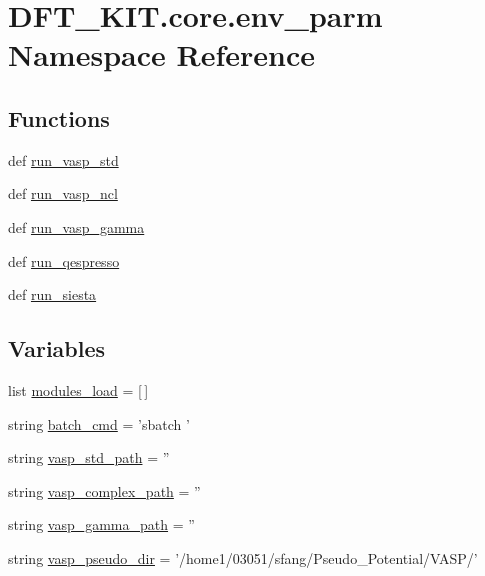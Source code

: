 \hypertarget{namespace_d_f_t___k_i_t_1_1core_1_1env__parm}{\section{D\+F\+T\+\_\+\+K\+I\+T.\+core.\+env\+\_\+parm Namespace Reference}
\label{namespace_d_f_t___k_i_t_1_1core_1_1env__parm}
}
\subsection*{Functions}
\begin{DoxyCompactItemize}
\item 
def \hyperlink{namespace_d_f_t___k_i_t_1_1core_1_1env__parm_abc1548747e1540c773ecc8b281e938a2}{run\+\_\+vasp\+\_\+std}
\item 
def \hyperlink{namespace_d_f_t___k_i_t_1_1core_1_1env__parm_a66b065db66a511ce73190355589c286c}{run\+\_\+vasp\+\_\+ncl}
\item 
def \hyperlink{namespace_d_f_t___k_i_t_1_1core_1_1env__parm_aa7ecd37243d15860fa50fb37c65206b3}{run\+\_\+vasp\+\_\+gamma}
\item 
def \hyperlink{namespace_d_f_t___k_i_t_1_1core_1_1env__parm_a386b907c5a5d32e54ae4248f10ee64aa}{run\+\_\+qespresso}
\item 
def \hyperlink{namespace_d_f_t___k_i_t_1_1core_1_1env__parm_a30c4bc231bfa6ded64d734f0b104c0ff}{run\+\_\+siesta}
\end{DoxyCompactItemize}
\subsection*{Variables}
\begin{DoxyCompactItemize}
\item 
list \hyperlink{namespace_d_f_t___k_i_t_1_1core_1_1env__parm_aa4e96fcf3d7fc30f9bc23ad6cbf9e0d2}{modules\+\_\+load} = \mbox{[}$\,$\mbox{]}
\item 
string \hyperlink{namespace_d_f_t___k_i_t_1_1core_1_1env__parm_a657fe74a6c9c40ff011f7ee616d36917}{batch\+\_\+cmd} = 'sbatch '
\item 
string \hyperlink{namespace_d_f_t___k_i_t_1_1core_1_1env__parm_ad9178a1c98b53b32a1cdd1937c614aa7}{vasp\+\_\+std\+\_\+path} = ''
\item 
string \hyperlink{namespace_d_f_t___k_i_t_1_1core_1_1env__parm_a01731a29ce04ed12b4752b0ed5e93b87}{vasp\+\_\+complex\+\_\+path} = ''
\item 
string \hyperlink{namespace_d_f_t___k_i_t_1_1core_1_1env__parm_ab34b5a21dd0bed4aeefc358692f2d723}{vasp\+\_\+gamma\+\_\+path} = ''
\item 
string \hyperlink{namespace_d_f_t___k_i_t_1_1core_1_1env__parm_a26bb9fdc8120f072bc91604e594bdd69}{vasp\+\_\+pseudo\+\_\+dir} = '/home1/03051/sfang/Pseudo\+\_\+\+Potential/V\+A\+S\+P/'
\end{DoxyCompactItemize}


